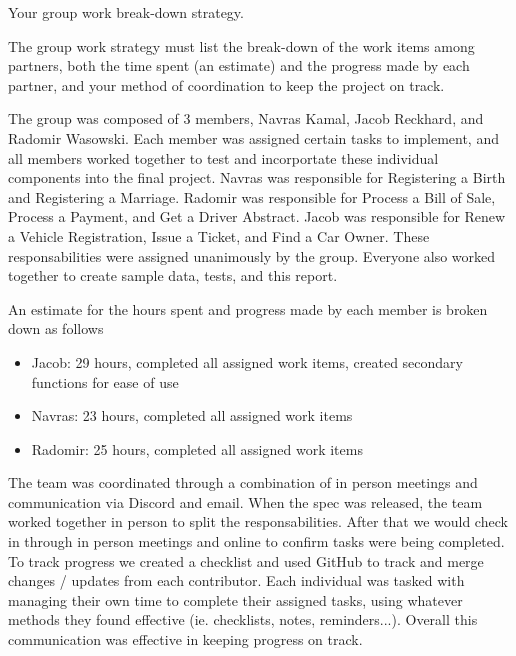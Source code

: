 Your group work break-down strategy.

The group work strategy must list the break-down of the work items among partners, both the time spent (an estimate) and the progress made by each partner, and your method of coordination to keep the project on track.

The group was composed of 3 members, Navras Kamal, Jacob Reckhard, and Radomir Wasowski.  Each member was assigned certain tasks to implement, and all members worked together to test and incorportate these individual components into the final project.  Navras was responsible for Registering a Birth and Registering a Marriage.  Radomir was responsible for Process a Bill of Sale, Process a Payment, and Get a Driver Abstract.  Jacob was responsible for Renew a Vehicle Registration, Issue a Ticket, and Find a Car Owner.  These responsabilities were assigned unanimously by the group.  Everyone also worked together to create sample data, tests, and this report.  

An estimate for the hours spent and progress made by each member is broken down as follows
\begin{itemize}
\item{Jacob: 29 hours, completed all assigned work items, created secondary functions for ease of use}
\item{Navras: 23 hours, completed all assigned work items}
\item{Radomir: 25 hours, completed all assigned work items}
\end{itemize}

The team was coordinated through a combination of in person meetings and communication via Discord and email.  When the spec was released, the team worked together in person to split the responsabilities.  After that we would check in through in person meetings and online to confirm tasks were being completed.  To track progress we created a checklist and used GitHub to track and merge changes / updates from each contributor.  Each individual was tasked with managing their own time to complete their assigned tasks, using whatever methods they found effective (ie. checklists, notes, reminders...).  Overall this communication was effective in keeping progress on track.  
